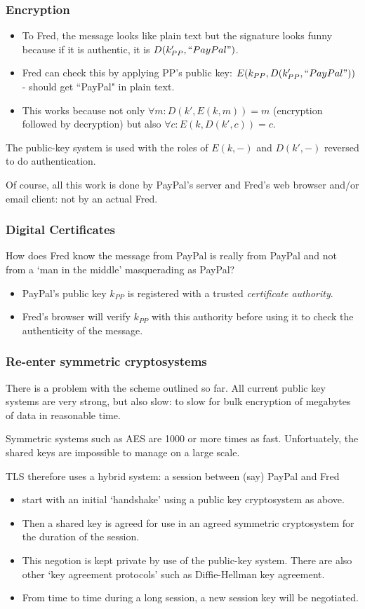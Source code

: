 \documentclass[10pt, hyperref={pdfpagelabels=false}]{beamer}
\begin{document}
\begin{frame}
\frametitle{Encryption}
\begin{itemize}
\item To Fred, the message looks like plain text but the signature looks funny because if it is authentic, it is $D(k'_{PP},``PayPal")$.
\item Fred can check this by applying PP's public key: $E(k_{PP},D(k'_{PP},``PayPal"))$ - should get ``PayPal" in plain text.
\item This works because not only {\color{brown}$\forall m: D(k', E(k,m)) = m$} (encryption followed by decryption) but also {\color{brown}$\forall c: E(k, D(k',c)) = c$}.
\end{itemize}

The public-key system is used with the roles of $E(k,-)$ and $D(k',-)$ reversed to do authentication.

Of course, all this work is done by PayPal's server and Fred's web browser and/or email client: not by an actual Fred. 
\end{frame}

\begin{frame}
\frametitle{Digital Certificates}
How does Fred know the message from PayPal is really from PayPal and not from a `man in the middle' masquerading as PayPal?
\begin{itemize}
\item PayPal's public key $k_{PP}$ is registered with a trusted \emph{\color{blue}certificate authority}.
\item Fred's browser will verify $k_{PP}$ with this authority before using it to check the authenticity of the message.
\end{itemize}
\end{frame}

\begin{frame}
\frametitle{Re-enter symmetric cryptosystems}
There is a problem with the scheme outlined so far. All current public key systems are very strong, but also slow: to slow for bulk encryption of megabytes of data in reasonable time.

Symmetric systems such as AES are 1000 or more times as fast. Unfortuately, the shared keys are impossible to manage on a large scale.

TLS therefore uses a hybrid system: a session between (say) PayPal and Fred
\begin{itemize}
\item start with an initial `handshake' using a public key cryptosystem as above.
\item Then a shared key is agreed for use in an agreed symmetric cryptosystem for the duration of the session.
\item This negotion is kept private by use of the public-key system. There are also other `key agreement protocols' such as Diffie-Hellman key agreement.
\item From time to time during a long session, a new session key will be negotiated.
\end{itemize}
\end{frame}
\end{document}
